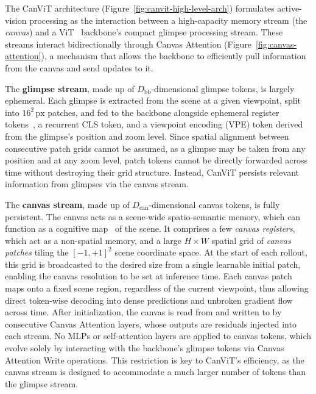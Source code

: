 \documentclass{article}
\newcommand{\Dcan}{D_{\text{can}}}
\newcommand{\Dbb}{D_{\text{bb}}}
\begin{document}
The CanViT architecture (Figure~\ref{fig:canvit-high-level-arch})
formulates active-vision processing
as the interaction between a high-capacity memory stream (the \emph{canvas})
and a \ac{ViT}~\cite{dosovitskiyImageWorth16x162020} backbone's compact glimpse processing stream.
These streams interact bidirectionally through
Canvas Attention (Figure~\ref{fig:canvas-attention}),
a mechanism that allows the backbone to efficiently pull information from the canvas and send updates to it.

The \textbf{glimpse stream}, made up of $\Dbb$-dimensional glimpse tokens, is largely ephemeral.
Each glimpse is extracted from the scene at a given viewpoint,
split into $16^2\,\text{px}$ patches,
and fed to the backbone alongside
ephemeral register tokens~\cite{darcetVisionTransformersNeed2023},
a recurrent CLS token,
and a viewpoint encoding (VPE) token derived from the glimpse's position and zoom level.
Since spatial alignment between consecutive patch grids cannot be assumed,
as a glimpse may be taken from any position and at any zoom level,
patch tokens cannot be directly forwarded across time without destroying their grid structure.
Instead, CanViT persists relevant information from glimpses via the canvas stream.

The \textbf{canvas stream}, made up of $\Dcan$-dimensional canvas tokens, is fully persistent.
The canvas acts as a scene-wide spatio-semantic memory,
which can function as a cognitive map~\cite{tolmanCognitiveMapsRats1948} of the scene.
It comprises a few \emph{canvas registers}, which act as a non-spatial memory,
and a large $H \times W$ spatial grid of \emph{canvas patches}
tiling the $[-1, +1]^2$ scene coordinate space.
At the start of each rollout, this grid is broadcasted to the desired size
from a single learnable initial patch,
enabling the canvas resolution to be set at inference time.
Each canvas patch maps onto a fixed scene region, regardless of the current viewpoint,
thus allowing direct token-wise decoding into dense predictions
and unbroken gradient flow across time.
After initialization,
the canvas is read from and written to by consecutive Canvas Attention layers,
whose outputs are residuals injected into each stream.
No \acp{MLP} or self-attention layers are applied to canvas tokens,
which evolve solely by interacting with the backbone's glimpse tokens via Canvas Attention Write operations.
This restriction is key to CanViT's efficiency, as the canvas stream is designed to accommodate a much larger number of tokens than the glimpse stream.
\end{document}
